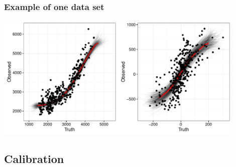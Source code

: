 \documentclass[handout]{beamer}\usepackage[]{graphicx}\usepackage[]{color}
\begin{document}


\begin{frame}
\frametitle{Example of one data set}
  \includegraphics[width=12cm,height=6cm]{predbvnsx.pdf}

\end{frame}

% 
% 

\subsection{Calibration}


% 
% 
% 
% 


% 
% 
% 
% 
% 
% 
\end{document}
